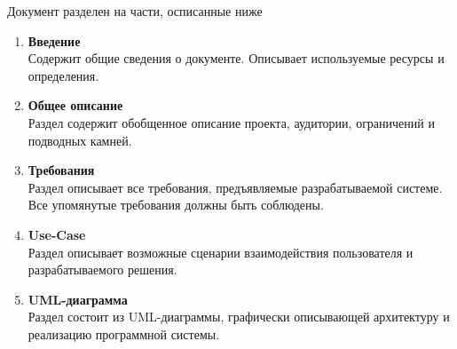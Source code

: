 
Документ разделен на части, осписанные ниже
\begin{enumerate}
    \item \textbf{Введение} \\
          Содержит общие сведения о документе. Описывает
          используемые ресурсы и определения.

    \item \textbf{Общее описание} \\
          Раздел содержит обобщенное описание проекта,
          аудитории, ограничений и подводных камней.

    \item \textbf{Требования} \\
          Раздел описывает все требования, предъявляемые
          разрабатываемой системе. Все упомянутые требования
          должны быть соблюдены.

    \item \textbf{Use-Case} \\
          Раздел описывает возможные сценарии взаимодействия
          пользователя и разрабатываемого решения.

    \item \textbf{UML-диаграмма} \\
          Раздел состоит из UML-диаграммы, графически
          описывающей архитектуру и реализацию программной
          системы.
\end{enumerate}
